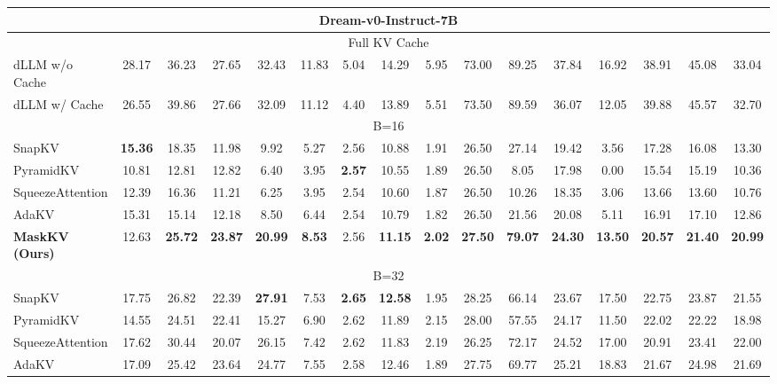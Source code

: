 \begin{table*}[t!]
{\begin{tabular}{@{}l*{15}{c}@{}}
        \midrule
        \multicolumn{16}{c}{\large \textbf{Dream-v0-Instruct-7B}} \\
        \midrule
        \multicolumn{16}{c}{\small Full KV Cache} \\
        \midrule
        dLLM w/o Cache & 28.17 & 36.23 & 27.65 & 32.43 & 11.83 & 5.04 & 14.29 & 5.95 & 73.00 & 89.25 & 37.84 & 16.92 & 38.91 & 45.08 & 33.04 \\
        dLLM w/ Cache & 26.55 & 39.86 & 27.66 & 32.09 & 11.12 & 4.40 & 13.89 & 5.51 & 73.50 & 89.59 & 36.07 & 12.05 & 39.88 & 45.57 & 32.70 \\
        \midrule
        \multicolumn{16}{c}{\small B=16} \\
        \midrule
        SnapKV & \textbf{15.36} & 18.35 & 11.98 & 9.92 & 5.27 & 2.56 & 10.88 & 1.91 & 26.50 & 27.14 & 19.42 & 3.56 & 17.28 & 16.08 & 13.30 \\
        PyramidKV & 10.81 & 12.81 & 12.82 & 6.40 & 3.95 & \textbf{2.57} & 10.55 & 1.89 & 26.50 & 8.05 & 17.98 & 0.00 & 15.54 & 15.19 & 10.36 \\
        SqueezeAttention & 12.39 & 16.36 & 11.21 & 6.25 & 3.95 & 2.54 & 10.60 & 1.87 & 26.50 & 10.26 & 18.35 & 3.06 & 13.66 & 13.60 & 10.76 \\
        AdaKV & 15.31 & 15.14 & 12.18 & 8.50 & 6.44 & 2.54 & 10.79 & 1.82 & 26.50 & 21.56 & 20.08 & 5.11 & 16.91 & 17.10 & 12.86 \\
        \rowcolor{lightgreen} \textbf{MaskKV (Ours)} & 12.63 & \textbf{25.72} & \textbf{23.87} & \textbf{20.99} & \textbf{8.53} & 2.56 & \textbf{11.15} & \textbf{2.02} & \textbf{27.50} & \textbf{79.07} & \textbf{24.30} & \textbf{13.50} & \textbf{20.57} & \textbf{21.40} & \textbf{20.99} \\
        \midrule
        \multicolumn{16}{c}{\small B=32} \\
        \midrule
        SnapKV & 17.75 & 26.82 & 22.39 & \textbf{27.91} & 7.53 & \textbf{2.65} & \textbf{12.58} & 1.95 & 28.25 & 66.14 & 23.67 & 17.50 & 22.75 & 23.87 & 21.55 \\
        PyramidKV & 14.55 & 24.51 & 22.41 & 15.27 & 6.90 & 2.62 & 11.89 & 2.15 & 28.00 & 57.55 & 24.17 & 11.50 & 22.02 & 22.22 & 18.98 \\
        SqueezeAttention & 17.62 & 30.44 & 20.07 & 26.15 & 7.42 & 2.62 & 11.83 & 2.19 & 26.25 & 72.17 & 24.52 & 17.00 & 20.91 & 23.41 & 22.00 \\
        AdaKV & 17.09 & 25.42 & 23.64 & 24.77 & 7.55 & 2.58 & 12.46 & 1.89 & 27.75 & 69.77 & 25.21 & 18.83 & 21.67 & 24.98 & 21.69 \\

\end{tabular}}
\end{table*}
